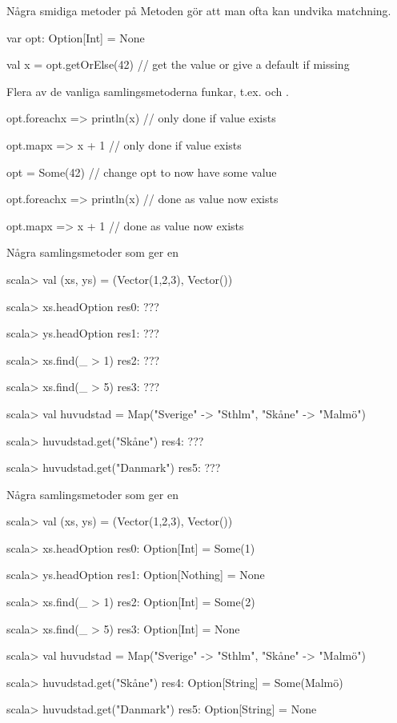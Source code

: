 \begin{Slide}{Några smidiga metoder på }\SlideFontSmall
Metoden  gör att man ofta kan undvika matchning.
\begin{Code}
var opt: Option[Int] = None

val x = opt.getOrElse(42)      // get the value or give a default if missing
\end{Code}

Flera av de vanliga samlingsmetoderna funkar, t.ex.  och .
\begin{Code}
opt.foreach{x => println(x)}    // only done if value exists

opt.map{x => x + 1}             // only done if value exists

opt = Some(42)                  // change opt to now have some value

opt.foreach{x => println(x)}    // done as value now exists

opt.map{x => x + 1}             // done as value now exists

\end{Code}
\end{Slide}


\begin{Slide}{Några samlingsmetoder som ger en }
\begin{REPL}
scala> val (xs, ys) = (Vector(1,2,3), Vector())

scala> xs.headOption
res0: ???

scala> ys.headOption
res1: ???

scala> xs.find(_ > 1)
res2: ???

scala> xs.find(_ > 5)
res3: ???

scala> val huvudstad = Map("Sverige" -> "Sthlm", "Skåne" -> "Malmö")

scala> huvudstad.get("Skåne")
res4: ???

scala> huvudstad.get("Danmark")
res5: ???
\end{REPL}
\end{Slide}

\begin{Slide}{Några samlingsmetoder som ger en }
\begin{REPL}
scala> val (xs, ys) = (Vector(1,2,3), Vector())

scala> xs.headOption
res0: Option[Int] = Some(1)

scala> ys.headOption
res1: Option[Nothing] = None

scala> xs.find(_ > 1)
res2: Option[Int] = Some(2)

scala> xs.find(_ > 5)
res3: Option[Int] = None

scala> val huvudstad = Map("Sverige" -> "Sthlm", "Skåne" -> "Malmö")

scala> huvudstad.get("Skåne")
res4: Option[String] = Some(Malmö)

scala> huvudstad.get("Danmark")
res5: Option[String] = None
\end{REPL}
\end{Slide}
